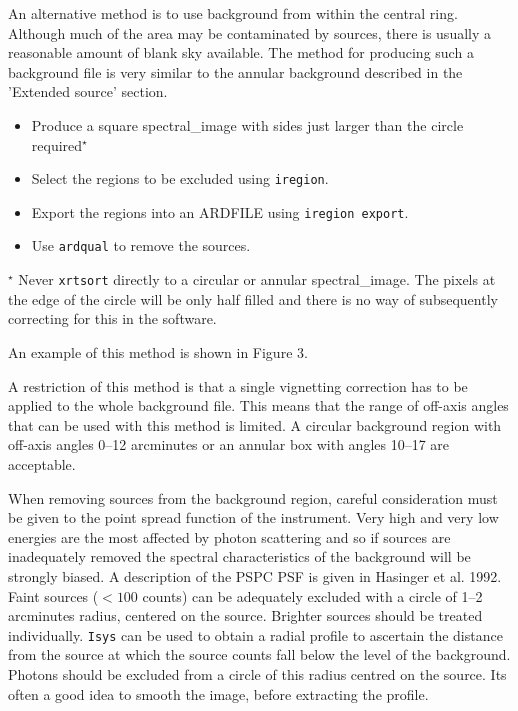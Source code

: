 \documentclass[11pt,fleqn]{article}    %
\begin{document}
An alternative method is to use background from within the central ring.
Although much of the area may be contaminated by sources, there is usually
a reasonable amount of blank sky available. The method for producing such
a background file is very similar to the annular background described in the
'Extended source' section. 

\begin{itemize}
   \item{Produce a square spectral\_image with sides just larger than
the circle required$^{\star}$} 
   \item{Select the regions to be excluded using {\tt iregion}.}
   \item{Export the regions into an ARDFILE using {\tt iregion export}.}
   \item{Use {\tt ardqual} to remove the sources.}
\end{itemize}

$^{\star}$ Never {\tt xrtsort} directly to a circular or annular
spectral\_image.  The pixels at the edge of the circle will be only half
filled and there is no way of subsequently correcting for this in the software.

An example of this method is shown in Figure 3.

A restriction of this method is that a single vignetting correction has
to be applied to the whole background file. This means that the range of 
off-axis angles that can be used with this method is limited. A circular 
background region with off-axis angles 0--12 arcminutes or an annular box with 
angles 10--17 are acceptable. 

When removing   sources from the   background region, careful consideration
must be given to the point spread function of the instrument. Very high and
very  low energies are the  most affected  by photon  scattering  and so if
sources  are  inadequately  removed the   spectral  characteristics  of the
background will be strongly biased. A description  of the PSPC PSF is given
in Hasinger et al.  1992. Faint sources ($<  100$ counts) can be adequately
excluded with a circle  of 1--2 arcminutes radius, centered  on the source. 
Brighter sources should be treated individually. {\tt  Isys} can be used to
obtain a radial profile to ascertain the distance from  the source at which
the source counts  fall below the  level of the background.  Photons should
be excluded from a circle of this radius  centred on the source.  Its often
a good idea to smooth the image, before extracting the profile.
\end{document}
